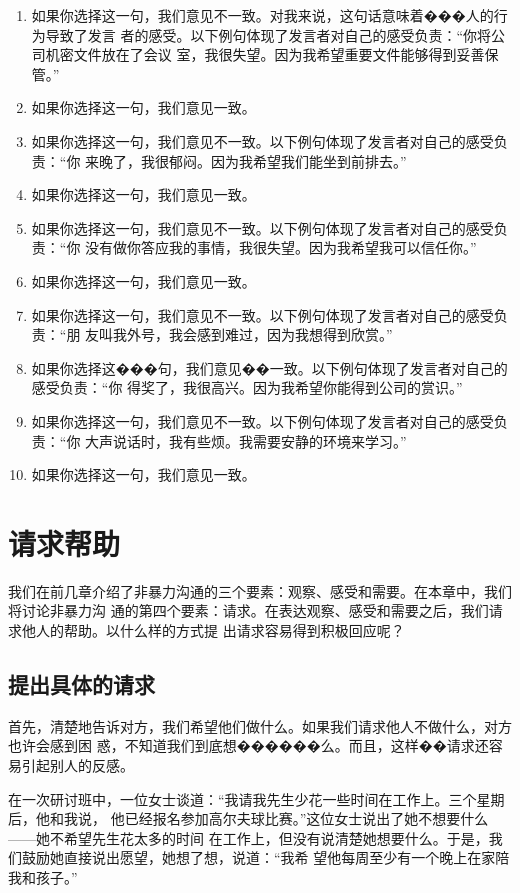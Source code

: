 \documentclass{ctexart}
\begin{document}
\begin{enumerate}[label=\arabic*)]
	\item 如果你选择这一句，我们意见不一致。对我来说，这句话意味着���人的行为导致了发言
	      者的感受。以下例句体现了发言者对自己的感受负责：``你将公司机密文件放在了会议
	      室，我很失望。因为我希望重要文件能够得到妥善保管。''
	\item 如果你选择这一句，我们意见一致。
	\item 如果你选择这一句，我们意见不一致。以下例句体现了发言者对自己的感受负责：``你
	      来晚了，我很郁闷。因为我希望我们能坐到前排去。''
	\item 如果你选择这一句，我们意见一致。
	\item 如果你选择这一句，我们意见不一致。以下例句体现了发言者对自己的感受负责：``你
	      没有做你答应我的事情，我很失望。因为我希望我可以信任你。''
	\item 如果你选择这一句，我们意见一致。
	\item 如果你选择这一句，我们意见不一致。以下例句体现了发言者对自己的感受负责：``朋
	      友叫我外号，我会感到难过，因为我想得到欣赏。''
	\item 如果你选择这���句，我们意见��一致。以下例句体现了发言者对自己的感受负责：``你
	      得奖了，我很高兴。因为我希望你能得到公司的赏识。''
	\item 如果你选择这一句，我们意见不一致。以下例句体现了发言者对自己的感受负责：``你
	      大声说话时，我有些烦。我需要安静的环境来学习。''
	\item 如果你选择这一句，我们意见一致。
\end{enumerate}

\section{请求帮助}\label{sec:请求帮助}

我们在前几章介绍了非暴力沟通的三个要素：观察、感受和需要。在本章中，我们将讨论非暴力沟
通的第四个要素：请求。在表达观察、感受和需要之后，我们请求他人的帮助。以什么样的方式提
出请求容易得到积极回应呢？

\subsection{提出具体的请求}

首先，清楚地告诉对方，我们希望他们做什么。如果我们请求他人不做什么，对方也许会感到困
惑，不知道我们到底想������么。而且，这样��请求还容易引起别人的反感。

在一次研讨班中，一位女士谈道：``我请我先生少花一些时间在工作上。三个星期后，他和我说，
他已经报名参加高尔夫球比赛。''这位女士说出了她不想要什么------她不希望先生花太多的时间
在工作上，但没有说清楚她想要什么。于是，我们鼓励她直接说出愿望，她想了想，说道：``我希
望他每周至少有一个晚上在家陪我和孩子。''
\end{document}
